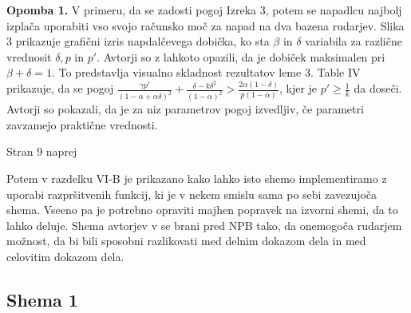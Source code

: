 \documentclass[12pt]{article}
\begin{document}
\textbf{Opomba 1.} V primeru, da se zadosti pogoj Izreka 3, potem se napadlcu najbolj izplača uporabiti vso svojo računsko moč za napad na dva bazena rudarjev. Slika 3 prikazuje grafični izris napdalčevega dobička, ko sta $\beta$ in $\delta$ variabila za različne vrednosit $\delta, p $ in $p'$. Avtorji so z lahkoto opazili, da je dobiček maksimalen pri $\beta + \delta = 1$. To predstavlja visualno skladnost rezultatov leme 3.
\newline
\newline
Table IV prikazuje, da se pogoj $\frac{\gamma p'}{(1 - \alpha + \alpha\delta)^2} + \frac{\delta - k\delta^2}{(1 - \alpha)^2} > \frac{2\alpha(1 - \delta)}{p(1 - \alpha)}$, kjer je $p' \geq \frac{1}{k}$ da doseči. Avtorji so pokazali, da je za niz parametrov pogoj izvedljiv, če parametri zavzamejo praktične vrednosti. 

\newpage 
Stran 9 naprej

Potem v razdelku VI-B je prikazano kako lahko isto shemo implementiramo z uporabi razpršitvenih funkcij, ki je v nekem smislu sama po sebi zavezujoča shema. Vseeno pa je potrebno opraviti majhen popravek na izvorni shemi, da to lahko deluje. Shema avtorjev v \cite{originalarticle} se brani pred NPB tako, da onemogoča rudarjem možnost, da bi bili sposobni razlikovati med delnim dokazom dela in med celovitim dokazom dela.

\subsection{Shema 1}
\end{document}
